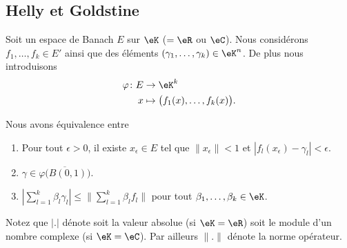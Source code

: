 \subsection{Helly et Goldstine}

\begin{lemma}	\label{LEMooSBWJooKIfuJj}
	Soit un espace de Banach \( E\) sur \( \eK\) (\( =\eR\) ou \( \eC\)). Nous considérons \( f_1,\ldots,f_k\in E'\) ainsi que des éléments \( (\gamma_1,\ldots,\gamma_k)\in \eK^n\). De plus nous introduisons
	\begin{equation}
		\begin{aligned}
			\varphi\colon E & \to \eK^k                                 \\
			x               & \mapsto \big( f_1(x),\ldots,f_k(x) \big).
		\end{aligned}
	\end{equation}

	Nous avons équivalence entre
	\begin{enumerate}
		\item		\label{ITEMooDMOOooPJtgTE}
		      Pour tout \( \epsilon>0\), il existe \( x_{\epsilon}\in E\) tel que \( \| x_{\epsilon} \|<1\) et \( | f_l(x_{\epsilon})-\gamma_{l} |<\epsilon\).
		\item		\label{ITEMooAQAJooHmSXGW}
		      \( \gamma\in\overline{\varphi\big( B(0,1) \big)}\).
		\item		\label{ITEMooXJKAooFHUsOv}
		      \( | \sum_{l=1}^k\beta_l\gamma_l |\leq \| \sum_{l=1}^k\beta_lf_l \|\) pour tout \( \beta_1,\ldots,\beta_k\in \eK\).
	\end{enumerate}
	Notez que \( | . |\) dénote soit la valeur absolue (si \( \eK=\eR\)) soit le module d'un nombre complexe (si \( \eK=\eC\)). Par ailleurs \( \| . \|\) dénote la norme opérateur.
\end{lemma}

